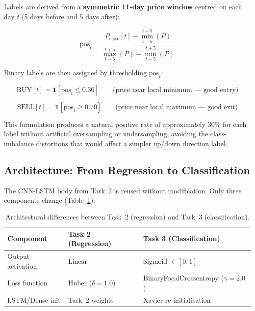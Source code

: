 \documentclass[12pt, a4paper]{article}
\begin{document}
Labels are derived from a \textbf{symmetric 11-day price window} centred
on each day $t$ (5 days before and 5 days after):

\begin{equation}
\text{pos}_t = \frac{P_{\text{close}}[t] - \min_{t-5}^{t+5}(P)}
                    {\max_{t-5}^{t+5}(P) - \min_{t-5}^{t+5}(P)}
\label{eq:pos}
\end{equation}

Binary labels are then assigned by thresholding $\text{pos}_t$:

\begin{equation}
\text{BUY}[t]  = \mathbf{1}[\text{pos}_t \leq 0.30]
\qquad \text{(price near local minimum --- good entry)}
\label{eq:buy_label}
\end{equation}

\begin{equation}
\text{SELL}[t] = \mathbf{1}[\text{pos}_t \geq 0.70]
\qquad \text{(price near local maximum --- good exit)}
\label{eq:sell_label}
\end{equation}

This formulation produces a natural positive rate of approximately
30\% for each label without artificial oversampling or undersampling,
avoiding the class-imbalance distortions that would affect a simpler
up/down direction label.

\subsection{Architecture: From Regression to Classification}

The CNN-LSTM body from Task~2 is reused without modification.
Only three components change (Table~\ref{tab:t3_arch_diff}):

\begin{table}[h]
\centering
\caption{Architectural differences between Task~2 (regression)
         and Task~3 (classification).}
\label{tab:t3_arch_diff}
\renewcommand{\arraystretch}{1.3}
\begin{tabular}{lll}
\hline
\textbf{Component} & \textbf{Task 2 (Regression)} & \textbf{Task 3 (Classification)} \\
\hline
Output activation & Linear               & Sigmoid $\in [0,1]$               \\
Loss function     & Huber ($\delta=1.0$) & BinaryFocalCrossentropy ($\gamma=2.0$) \\
LSTM/Dense init   & Task~2 weights       & Xavier re-initialisation           \\
\hline
\end{tabular}
\end{table}
\end{document}
